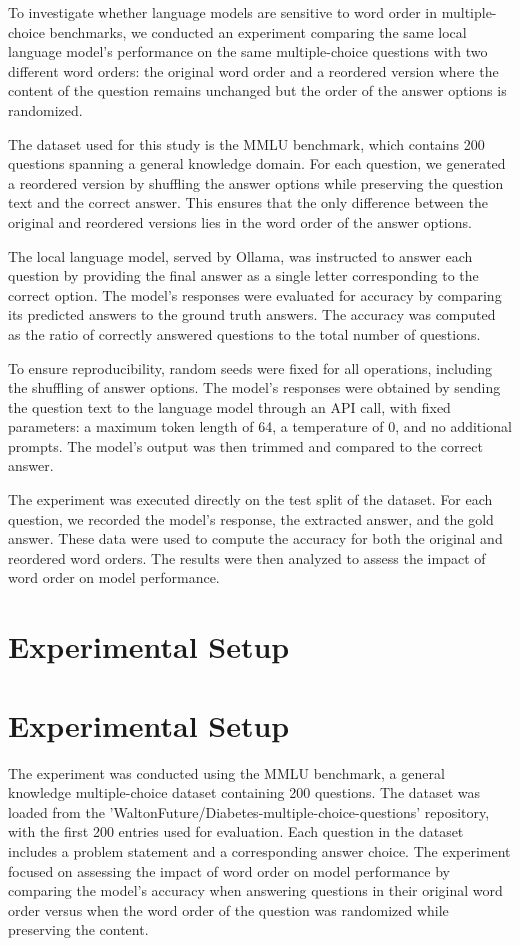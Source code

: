 \documentclass{article}
\begin{document}
To investigate whether language models are sensitive to word order in multiple-choice benchmarks, we conducted an experiment comparing the same local language model's performance on the same multiple-choice questions with two different word orders: the original word order and a reordered version where the content of the question remains unchanged but the order of the answer options is randomized. 

The dataset used for this study is the MMLU benchmark, which contains 200 questions spanning a general knowledge domain. For each question, we generated a reordered version by shuffling the answer options while preserving the question text and the correct answer. This ensures that the only difference between the original and reordered versions lies in the word order of the answer options.

The local language model, served by Ollama, was instructed to answer each question by providing the final answer as a single letter corresponding to the correct option. The model's responses were evaluated for accuracy by comparing its predicted answers to the ground truth answers. The accuracy was computed as the ratio of correctly answered questions to the total number of questions.

To ensure reproducibility, random seeds were fixed for all operations, including the shuffling of answer options. The model's responses were obtained by sending the question text to the language model through an API call, with fixed parameters: a maximum token length of 64, a temperature of 0, and no additional prompts. The model's output was then trimmed and compared to the correct answer.

The experiment was executed directly on the test split of the dataset. For each question, we recorded the model's response, the extracted answer, and the gold answer. These data were used to compute the accuracy for both the original and reordered word orders. The results were then analyzed to assess the impact of word order on model performance.
\section{Experimental Setup}
\section*{Experimental Setup}

The experiment was conducted using the MMLU benchmark, a general knowledge multiple-choice dataset containing 200 questions. The dataset was loaded from the 'WaltonFuture/Diabetes-multiple-choice-questions' repository, with the first 200 entries used for evaluation. Each question in the dataset includes a problem statement and a corresponding answer choice. The experiment focused on assessing the impact of word order on model performance by comparing the model's accuracy when answering questions in their original word order versus when the word order of the question was randomized while preserving the content.
\end{document}
